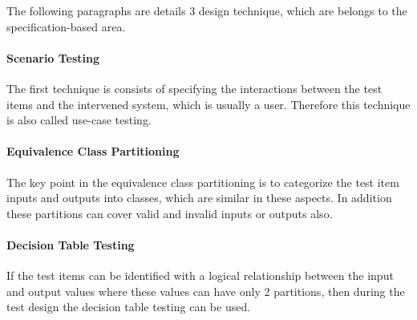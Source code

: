 The following paragraphs are details 3 design technique, which are belongs to the specification-based area.
\paragraph{Scenario Testing} The first technique is consists of specifying the interactions between the test items and the intervened system, which is usually a user. Therefore this technique is also called use-case testing. 

\paragraph{Equivalence Class Partitioning} The key point in the equivalence class partitioning is to categorize the test item inputs and outputs into classes, which are similar in these aspects. In addition these partitions can cover valid and invalid inputs or outputs also. 

\paragraph{Decision Table Testing} If the test items can be identified with a logical relationship between the input and output values where these values can have only 2 partitions, then during the test design the decision table testing can be used.

